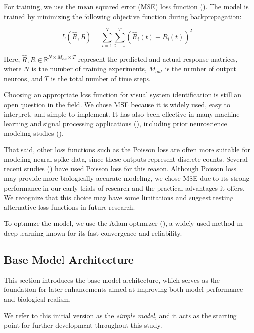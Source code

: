 For training, we use the mean squared error (MSE) loss function (\citet{alpaydin2020introduction}). The model is trained by minimizing the following objective function during backpropagation:

\begin{equation*}
    L(\hat{R}, R) = \sum_{i=1}^{N}\sum_{t=1}^{T}\left(\hat{R}_i(t) - R_i(t)\right)^2
\end{equation*}

Here, $\hat{R}, R \in \mathbb{R}^{N \times M_{out} \times T}$ represent the predicted and actual response matrices, where $N$ is the number of training experiments, $M_{out}$ is the number of output neurons, and $T$ is the total number of time steps.

Choosing an appropriate loss function for visual system identification is still an open question in the field. We chose MSE because it is widely used, easy to interpret, and simple to implement. It has also been effective in many machine learning and signal processing applications (\citet{wang2009mse, soderstrom2018errors}), including prior neuroscience modeling studies (\citet{antolik2016local}).

That said, other loss functions such as the Poisson loss are often more suitable for modeling neural spike data, since these outputs represent discrete counts. Several recent studies (\citet{terven2024lossfunctionsmetricsdeep, Wang2023towards, sinz2018stimulus}) have used Poisson loss for this reason. Although Poisson loss may provide more biologically accurate modeling, we chose MSE due to its strong performance in our early trials of research and the practical advantages it offers. We recognize that this choice may have some limitations and suggest testing alternative loss functions in future research.

To optimize the model, we use the Adam optimizer (\citet{kingma2017adammethodstochasticoptimization}), a widely used method in deep learning known for its fast convergence and reliability.

\subsection{Base Model Architecture}
\label{subsec:base_model_architecture}

This section introduces the base model architecture, which serves as the foundation for later enhancements aimed at improving both model performance and biological realism.

We refer to this initial version as the \emph{simple model}, and it acts as the starting point for further development throughout this study.

